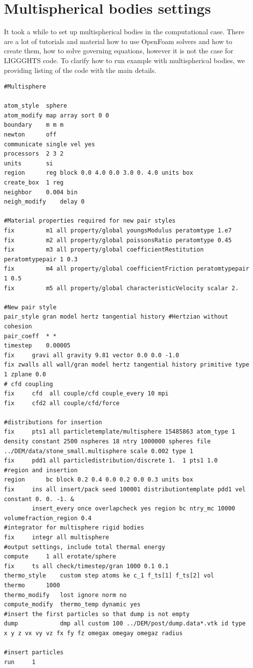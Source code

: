 \section{Multispherical bodies settings}

It took a while to set up multispherical bodies in the computational case. There are a lot of tutorials and material how to use OpenFoam solvers and how to create them, how to solve governing equations, however it is not the case for LIGGGHTS code. To clarify how to run example with multispherical bodies, we providing listing of the code with the main details.

\begin{lstlisting}[caption={LIGGGHTS Script}, label={lst:liggghts-script}]
#Multisphere

atom_style	sphere
atom_modify	map array sort 0 0
boundary	m m m
newton		off
communicate	single vel yes
processors	2 3 2
units		si
region		reg block 0.0 4.0 0.0 3.0 0. 4.0 units box
create_box	1 reg
neighbor	0.004 bin
neigh_modify	delay 0

#Material properties required for new pair styles
fix 		m1 all property/global youngsModulus peratomtype 1.e7
fix 		m2 all property/global poissonsRatio peratomtype 0.45
fix 		m3 all property/global coefficientRestitution peratomtypepair 1 0.3
fix 		m4 all property/global coefficientFriction peratomtypepair 1 0.5
fix 		m5 all property/global characteristicVelocity scalar 2.

#New pair style
pair_style gran model hertz tangential history #Hertzian without cohesion
pair_coeff	* *
timestep	0.00005
fix		gravi all gravity 9.81 vector 0.0 0.0 -1.0
fix zwalls all wall/gran model hertz tangential history primitive type 1 zplane 0.0
# cfd coupling
fix     cfd  all couple/cfd couple_every 10 mpi
fix     cfd2 all couple/cfd/force

#distributions for insertion
fix		pts1 all particletemplate/multisphere 15485863 atom_type 1 density constant 2500 nspheres 18 ntry 1000000 spheres file ../DEM/data/stone_small.multisphere scale 0.002 type 1
fix		pdd1 all particledistribution/discrete 1.  1 pts1 1.0
#region and insertion
region		bc block 0.2 0.4 0.0 0.2 0.0 0.3 units box
fix		ins all insert/pack seed 100001 distributiontemplate pdd1 vel constant 0. 0. -1. &
		insert_every once overlapcheck yes region bc ntry_mc 10000 volumefraction_region 0.4
#integrator for multisphere rigid bodies
fix		integr all multisphere
#output settings, include total thermal energy
compute		1 all erotate/sphere
fix		ts all check/timestep/gran 1000 0.1 0.1
thermo_style	custom step atoms ke c_1 f_ts[1] f_ts[2] vol
thermo		1000
thermo_modify	lost ignore norm no
compute_modify	thermo_temp dynamic yes
#insert the first particles so that dump is not empty
dump            dmp all custom 100 ../DEM/post/dump.data*.vtk id type x y z vx vy vz fx fy fz omegax omegay omegaz radius

#insert particles
run		1
\end{lstlisting}
